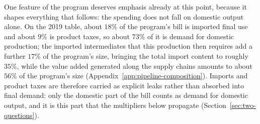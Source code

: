 One feature of the program deserves emphasis already at this point, because it shapes
everything that follows: the spending does not fall on domestic output alone. On the 2019 table, about $18\%$ of the program's bill is imported final use and
about $9\%$ is product taxes, so about $73\%$ of it is demand for domestic
production; the imported intermediates that this production then requires add a further
$17\%$ of the program's size, bringing the total import content to roughly
$35\%$, while the value added generated along the supply chains amounts to about
$56\%$ of the program's size (Appendix~\ref{app:pipeline-composition}). Imports and product taxes are
therefore carried as explicit leaks rather than absorbed into final demand: only the
domestic part of the bill counts as demand for domestic output, and it is this part that the
multipliers below propagate (Section~\ref{sec:two-questions}).




